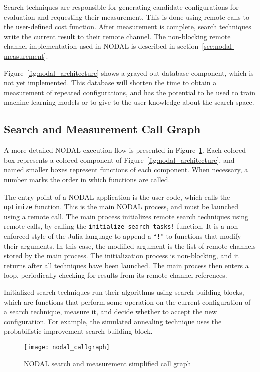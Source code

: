 Search techniques are responsible for generating candidate configurations for
evaluation and requesting their measurement. This is done using remote calls to
the user-defined cost function. After measurement is complete, search
techniques write the current result to their remote channel.  The non-blocking
remote channel implementation used in NODAL  is described in
section~\ref{sec:nodal-measurement}.

Figure~\ref{fig:nodal_architecture} shows a grayed out database component,
which is not yet implemented. This database will shorten the time to obtain a
measurement of repeated configurations, and has the potential to be used to
train machine learning models or to give to the user knowledge about the search
space.

\subsection{Search and Measurement Call Graph}

A more detailed NODAL execution flow is presented in
Figure~\ref{fig:nodal_callgraph}. Each colored box represents a colored
component of Figure~\ref{fig:nodal_architecture}, and named smaller boxes
represent functions of each component. When necessary, a number marks the order
in which functions are called.

The entry point of a NODAL application is the user code, which calls the
\texttt{optimize} function. This is the main NODAL process, and must be
launched using a remote call. The main process initializes remote search
techniques using remote calls, by calling the
\texttt{initialize\_search\_tasks!} function. It is a non-enforced style of the
Julia language to append a ``\texttt{!}'' to functions that modify their
arguments. In this case, the modified argument is the list of remote channels
stored by the main process.  The initialization process is non-blocking, and it
returns after all techniques have been launched. The main process then enters a
loop, periodically checking for results from its remote channel references.

Initialized search techniques run their algorithms using search building
blocks, which are functions that perform some operation on the current
configuration of a search technique, measure it, and decide whether to accept
the new configuration. For example, the simulated annealing technique uses
the probabilistic improvement search building block.

\begin{figure}[htpb]
    \centering
    \texttt{[image: nodal\_callgraph]}
    \caption{NODAL search and measurement simplified call graph}
    \label{fig:nodal_callgraph}
\end{figure}

